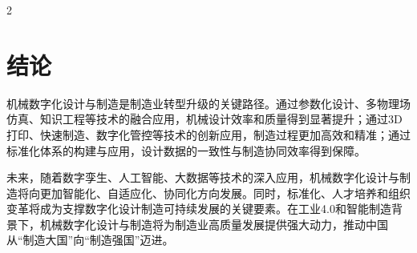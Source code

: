 \documentclass[fontset=windows,12pt,UTF8]{ctexart}
\begin{document}
\begin{multicols}{2}
	\section{结论}

	机械数字化设计与制造是制造业转型升级的关键路径。通过参数化设计、多物理场仿真、知识工程等技术的融合应用，机械设计效率和质量得到显著提升；通过3D打印、快速制造、数字化管控等技术的创新应用，制造过程更加高效和精准；通过标准化体系的构建与应用，设计数据的一致性与制造协同效率得到保障。

	未来，随着数字孪生、人工智能、大数据等技术的深入应用，机械数字化设计与制造将向更加智能化、自适应化、协同化方向发展。同时，标准化、人才培养和组织变革将成为支撑数字化设计制造可持续发展的关键要素。在工业4.0和智能制造背景下，机械数字化设计与制造将为制造业高质量发展提供强大动力，推动中国从“制造大国”向“制造强国”迈进。

	\printbibliography[title={\sffamily\zihao{5}【参考文献】}]

\end{multicols}
\end{document}
